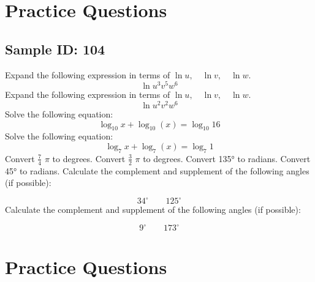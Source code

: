 \documentclass{exam}
\begin{document}
\section*{Practice Questions}
\subsection*{Sample ID: 104}
\begin{questions}
\question Expand the following expression in terms of $\ln u,\quad \ln v,\quad  \ln w$. \[\ln u^{3}v^{5}w^{6}\] 
\question Expand the following expression in terms of $\ln u,\quad \ln v,\quad  \ln w$. \[\ln u^{2}v^{2}w^{6}\] 
\question Solve the following equation: 
 \[\log_{10}{x}+\log_{10}{\left(x\right)}=\log_{10}{16}\]
\question Solve the following equation: 
 \[\log_{7}{x}+\log_{7}{\left(x\right)}=\log_{7}{1}\]
\newpage
\question Convert $\frac{7}{4}$ $\pi$   to degrees.
\question Convert $\frac{3}{2}$ $\pi$   to degrees.
\question Convert 135° to radians.
\question Convert 45° to radians.
\question Calculate the complement and supplement of the following angles (if possible):
 
                  \[34^{\circ}\quad\quad 125^{\circ}\]\question Calculate the complement and supplement of the following angles (if possible):
 
                  \[9^{\circ}\quad\quad 173^{\circ}\]\end{questions}\newpage
\section*{Practice Questions}
\end{document}
